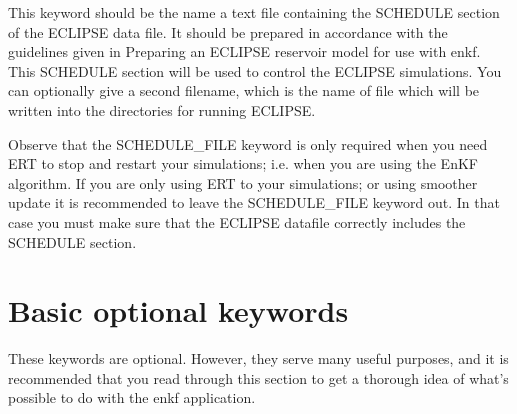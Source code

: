 \documentclass[a4paper,10pt,english]{sphinxmanual}
\begin{document}
\begin{sphinxShadowBox}

This keyword should be the name a text file containing the SCHEDULE section of
the ECLIPSE data file. It should be prepared in accordance with the guidelines
given in Preparing an ECLIPSE reservoir model for use with enkf. This SCHEDULE
section will be used to control the ECLIPSE simulations. You can optionally
give a second filename, which is the name of file which will be written into
the directories for running ECLIPSE.


%
\begin{sphinxVerbatim}[commandchars=\\\{\}]
       
  
\end{sphinxVerbatim}

Observe that the SCHEDULE\_FILE keyword is only required when you need ERT to
stop and restart your simulations; i.e. when you are using the EnKF algorithm.
If you are only using ERT to your simulations; or using smoother update it is
recommended to leave the SCHEDULE\_FILE keyword out. In that case you must make
sure that the ECLIPSE datafile correctly includes the SCHEDULE section.
\end{sphinxShadowBox}


\section{Basic optional keywords}
\label{\detokenize{keywords/index:basic-optional-keywords}}\label{\detokenize{keywords/index:id2}}
These keywords are optional. However, they serve many useful purposes, and it is
recommended that you read through this section to get a thorough idea of what’s
possible to do with the enkf application.
\end{document}
